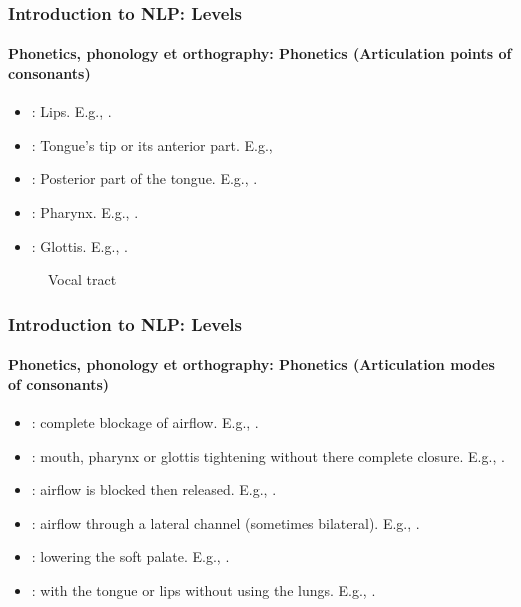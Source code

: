 \documentclass[xcolor=table]{beamer}
\begin{document}
\begin{frame}
\frametitle{Introduction to NLP: Levels}
\framesubtitle{Phonetics, phonology et orthography: Phonetics (Articulation points of consonants)}

\begin{minipage}{0.5\textwidth}
\begin{itemize}
	\item {}: Lips. E.g., \expword{\textipa{[b], [p], [m], [f], [v]}}.
	\item {}: Tongue's tip or its anterior part. 
	E.g., 
	\item {}: Posterior part of the tongue. E.g., .
	\item {}: Pharynx. 
	E.g., .
	\item {}: Glottis. 
	E.g., .
\end{itemize}
\end{minipage}
\begin{minipage}{0.48\textwidth}
	\begin{figure}
		\caption{Vocal tract \cite{2009-ball}}
	\end{figure}
\end{minipage}

\end{frame}

\begin{frame}
\frametitle{Introduction to NLP: Levels}
\framesubtitle{Phonetics, phonology et orthography: Phonetics (Articulation modes of consonants)}

\begin{itemize}
	\item {}: complete blockage of airflow.
	E.g., \expword{\textipa{[p], [k], [b], [m], [n]}}.
	
	\item {}: mouth, pharynx or glottis tightening without there complete closure.
	E.g., \expword{\textipa{[f], [v], [s]}}.
	
	\item {}: airflow is blocked then released.
	E.g., \expword{\textipa{[\t{\textteshlig}]}}.
	
	\item {}: airflow through a lateral channel (sometimes bilateral).
	E.g., \expword{\textipa{[l]}}.
	
	\item {}: lowering the soft palate.
	E.g., \expword{\textipa{[m], [n]}}.
	
	\item {}: with the tongue or lips without using the lungs.
	E.g., .
	
\end{itemize}

\end{frame}
\end{document}
